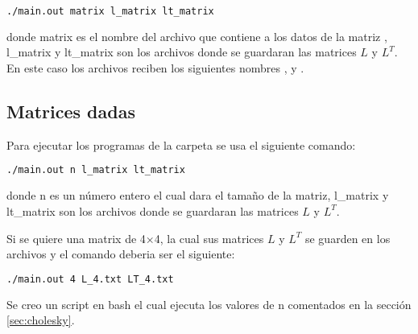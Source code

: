 \begin{lstlisting}[language=bash]
    ./main.out matrix l_matrix lt_matrix 
\end{lstlisting}

donde matrix es el nombre del archivo que contiene a los datos de la matriz , l\_matrix y lt\_matrix son los archivos donde se guardaran las matrices $L$ y $L^T$. En este caso los archivos reciben los siguientes nombres ,  y .

\subsection{Matrices dadas}

Para ejecutar los programas de la carpeta  se usa el siguiente comando:

\begin{lstlisting}[language=bash]
    ./main.out n l_matrix lt_matrix 
\end{lstlisting}

donde n es un número entero el cual dara el tamaño de la matriz, l\_matrix y lt\_matrix son los archivos donde se guardaran las matrices $L$ y $L^T$.

Si se quiere una matrix de 4$\times$4, la cual sus matrices $L$ y $L^T$ se guarden en los archivos  y  el comando deberia ser el siguiente:

\begin{lstlisting}[language=bash]
    ./main.out 4 L_4.txt LT_4.txt
\end{lstlisting}

Se creo un script en bash el cual ejecuta los valores de n comentados en la sección \ref{sec:cholesky}.